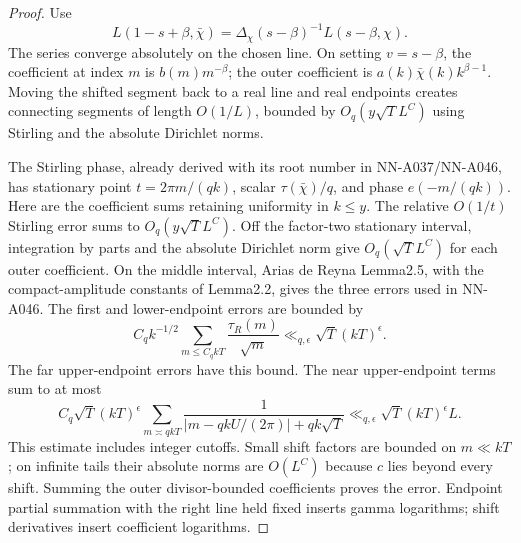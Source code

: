 \begin{proof}
Use
\[
 L(1-s+\beta,\bar\chi)
       =\Delta_\chi(s-\beta)^{-1}L(s-\beta,\chi).
\]
The series converge absolutely on the chosen line.
On setting \(v=s-\beta\), the coefficient at index
\(m\) is \(b(m)m^{-\beta}\); the outer coefficient
is \(a(k)\bar\chi(k)k^{\beta-1}\).
Moving the shifted segment back to a real line and
real endpoints creates connecting segments of
length \(O(1/L)\), bounded by \(O_q(y\sqrt T L^C)\)
using Stirling and the absolute Dirichlet norms.

The Stirling phase, already derived with its root
number in NN-A037/NN-A046, has stationary point
\(t=2\pi m/(qk)\), scalar \(\tau(\bar\chi)/q\),
and phase \(e(-m/(qk))\).
Here are the coefficient sums retaining uniformity
in \(k\le y\). The relative \(O(1/t)\) Stirling
error sums to \(O_q(y\sqrt T L^C)\).
Off the factor-two stationary interval, integration
by parts and the absolute Dirichlet norm give
\(O_q(\sqrt T L^C)\) for each outer coefficient.
On the middle interval, Arias de Reyna Lemma2.5,
with the compact-amplitude constants of Lemma2.2,
gives the three errors used in NN-A046.
The first and lower-endpoint errors are bounded by
\[
 C_q k^{-1/2}\sum_{m\le C_q kT}
             \frac{\tau_R(m)}{\sqrt m}
                 \ll_{q,\epsilon}\sqrt T(kT)^\epsilon.
\]
The far upper-endpoint errors have this bound.
The near upper-endpoint terms sum to at most
\[
 C_q\sqrt T(kT)^\epsilon
       \sum_{m\asymp qkT}
        \frac1{|m-qkU/(2\pi)|+qk\sqrt T}
              \ll_{q,\epsilon}\sqrt T(kT)^\epsilon L.
\]
This estimate includes integer cutoffs. Small shift
factors are bounded on \(m\ll kT\); on infinite
tails their absolute norms are \(O(L^C)\) because
\(c\) lies beyond every shift. Summing the outer
divisor-bounded coefficients proves the error.
Endpoint partial summation with the right line
held fixed inserts gamma logarithms; shift
derivatives insert coefficient logarithms.
\end{proof}

